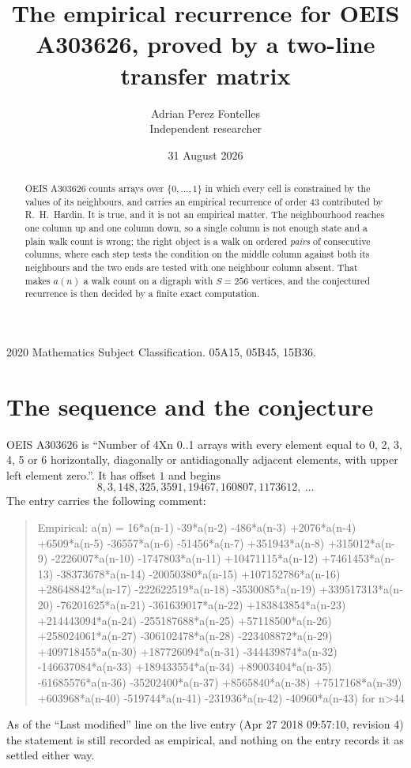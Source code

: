 \documentclass[11pt,a4paper]{article}
\title{The empirical recurrence for OEIS A303626, proved by a two-line transfer matrix}
\author{Adrian Perez Fontelles\\ \small Independent researcher}
\date{31 August 2026}
\theoremstyle{plain}
\theoremstyle{definition}
\begin{document}
\maketitle

\begin{abstract}
OEIS A303626 counts arrays over $\{0,\dots,1\}$ in which every cell is constrained by the
values of its neighbours, and carries an empirical recurrence of order $43$ contributed
by R.~H.~Hardin. It is true, and it is not an empirical matter. The neighbourhood reaches one
column up and one column down, so a single column is not enough state and a plain walk count
is wrong; the right object is a walk on ordered \emph{pairs} of consecutive columns, where
each step tests the condition on the middle column against both its neighbours and the two
ends are tested with one neighbour column absent. That makes $a(n)$ a walk count on a digraph
with $S=256$ vertices, and the conjectured recurrence is then decided by a finite exact
computation.
\end{abstract}

\noindent\small 2020 Mathematics Subject Classification. 05A15, 05B45, 15B36.\normalsize

\section{The sequence and the conjecture}

OEIS A303626 is ``Number of 4Xn 0..1 arrays with every element equal to 0, 2, 3, 4, 5 or 6 horizontally, diagonally or antidiagonally adjacent elements, with upper left element zero.''. It has offset $1$ and begins
\[
8, 3, 148, 325, 3591, 19467, 160807, 1173612,\ \dots
\]
The entry carries the following comment:
\begin{quote}\small
Empirical: a(n) = 16*a(n-1) -39*a(n-2) -486*a(n-3) +2076*a(n-4) +6509*a(n-5) -36557*a(n-6) -51456*a(n-7) +351943*a(n-8) +315012*a(n-9) -2226007*a(n-10) -1747803*a(n-11) +10471115*a(n-12) +7461453*a(n-13) -38373678*a(n-14) -20050380*a(n-15) +107152786*a(n-16) +28648842*a(n-17) -222622519*a(n-18) -3530085*a(n-19) +339517313*a(n-20) -76201625*a(n-21) -361639017*a(n-22) +183843854*a(n-23) +214443094*a(n-24) -255187688*a(n-25) +57118500*a(n-26) +258024061*a(n-27) -306102478*a(n-28) -223408872*a(n-29) +409718455*a(n-30) +187726094*a(n-31) -344439874*a(n-32) -146637084*a(n-33) +189433554*a(n-34) +89003404*a(n-35) -61685576*a(n-36) -35202400*a(n-37) +8565840*a(n-38) +7517168*a(n-39) +603968*a(n-40) -519744*a(n-41) -231936*a(n-42) -40960*a(n-43) for n>44
\end{quote}
As of the ``Last modified'' line on the live entry (Apr 27 2018 09:57:10, revision 4) the statement is
still recorded as empirical, and nothing on the entry records it as settled either way.
\end{document}
